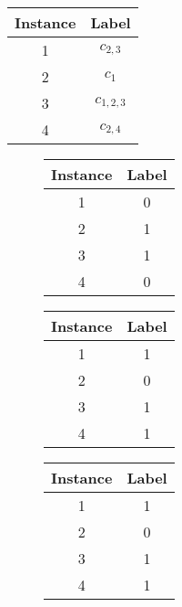 \documentclass[Dissertation.tex]{subfiles}
\begin{document}
\begin{table}[]
\begin{subfigure}[t]{0.25\linewidth}
\begin{tabular*}{1\linewidth}{@{}cc@{}}
			\toprule
			Instance & Label \\ \midrule
			1	&	$ c_{2,3} $        \\
			2	&	$ c_1$        \\
			3	&	$ c_{1,2,3} $        \\
			4	&	$ c_{2,4} $        \\ \bottomrule
		\end{tabular*}
	\end{subfigure}

\vspace{3.5em}

	\begin{subfigure}{1\linewidth}
		\centering
			\begin{subfigure}{0.2\linewidth}
				\begin{tabular*}{1\linewidth}{@{}cc@{}}
					\toprule
					Instance & Label \\ \midrule
					1	&	0        \\
					2	&	1        \\
					3	&   1 	    \\
					4	&   0	    \\ \bottomrule
				\end{tabular*}
			\end{subfigure}
			\quad
			\begin{subfigure}{0.2\linewidth}
				\begin{tabular*}{1\linewidth}{@{}cc@{}}
					\toprule
					Instance & Label \\ \midrule
					1	&	1        \\
					2	&	0        \\
					3	&	1        \\
					4	&	1        \\ \bottomrule
				\end{tabular*}
			\end{subfigure}
			\quad
			\begin{subfigure}{0.2\linewidth}
				\begin{tabular*}{1\linewidth}{@{}cc@{}}
					\toprule
					Instance & Label \\ \midrule
					1	&	1        \\
					2	&	0        \\
					3	&	1        \\
					4	&	1        \\ \bottomrule
				\end{tabular*}

\end{subfigure}
\end{subfigure}
\end{table}
\end{document}
